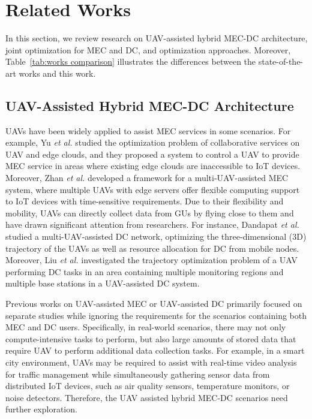 \section{Related Works}
\label{sec:related works}

\par In this section, we review research on UAV-assisted hybrid MEC-DC architecture, joint optimization for MEC and DC, and optimization approaches. Moreover, Table~\ref{tab:works comparison} illustrates the differences between the state-of-the-art works and this work.

\subsection{UAV-Assisted Hybrid MEC-DC Architecture}

\par UAVs have been widely applied to assist MEC services in some scenarios. For example, Yu \textit{et al.} \cite{Yu2020} studied the optimization problem of collaborative services on UAV and edge clouds, and they proposed a system to control a UAV to provide MEC service in areas where existing edge clouds are inaccessible to IoT devices. Moreover, Zhan \textit{et al.} \cite{Zhan2021} developed a framework for a multi-UAV-assisted MEC system, where multiple UAVs with edge servers offer flexible computing support to IoT devices with time-sensitive requirements. Due to their flexibility and mobility, UAVs can directly collect data from GUs by flying close to them and have drawn significant attention from researchers. For instance, Dandapat \textit{et al.} \cite{Dandapat2024} studied a multi-UAV-assisted DC network, optimizing the three-dimensional (3D) trajectory of the UAVs as well as resource allocation for DC from mobile nodes. Moreover, Liu \textit{et al.} \cite{Liu2024} investigated the trajectory optimization problem of a UAV performing DC tasks in an area containing multiple monitoring regions and multiple base stations in a UAV-assisted DC system. 

\par Previous works on UAV-assisted MEC or UAV-assisted DC primarily focused on separate studies while ignoring the requirements for the scenarios containing both MEC and DC users. Specifically, in real-world scenarios, there may not only compute-intensive tasks to perform, but also large amounts of stored data that require UAV to perform additional data collection tasks. For example, in a smart city environment, UAVs may be required to assist with real-time video analysis for traffic management while simultaneously gathering sensor data from distributed IoT devices, such as air quality sensors, temperature monitors, or noise detectors. Therefore, the UAV assisted hybrid MEC-DC scenarios need further exploration.

